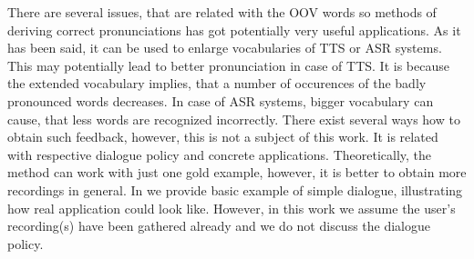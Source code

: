 There are several issues, that are related with the OOV words so methods of deriving correct pronunciations has got potentially very useful applications.
As it has been said, it can be used to enlarge vocabularies of TTS or ASR systems.
This may potentially lead to better pronunciation in case of TTS.
It is because the extended vocabulary implies, that a number of occurences of the badly pronounced words decreases.
In case of ASR systems, bigger vocabulary can cause, that less words are recognized incorrectly.
There exist several ways how to obtain such feedback, however, this is not a subject of this work.
It is related with respective dialogue policy and concrete applications.
Theoretically, the method can work with just one gold example, however, it is better to obtain more recordings in general.
In  we provide basic example of simple dialogue, illustrating how real application could look like.
However, in this work we assume the user's recording(s) have been gathered already and we do not discuss the dialogue policy.
